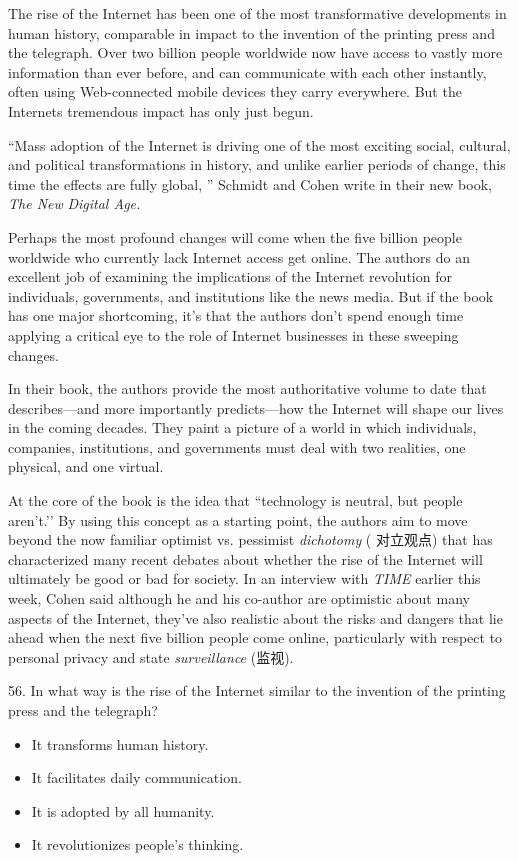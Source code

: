 \documentclass[UTF8,11pt]{ctexart}
\begin{document}
The rise of the Internet has been one of the most transformative developments in human history, comparable in impact to the invention of the printing press and the telegraph. Over two billion people worldwide now have access to vastly more information than ever before, and can communicate with each other instantly, often using Web-connected mobile devices they carry everywhere. But the Internets tremendous impact has only just begun.


“Mass adoption of the Internet is driving one of the most exciting social, cultural, and political transformations in history, and unlike earlier periods of change, this time the effects are fully global, ” Schmidt and Cohen write in their new book,\textit{ The New} \textit{Digital Age.}


Perhaps the most profound changes will come when the five billion people worldwide who currently lack Internet access get online. The authors do an excellent job of examining the implications of the Internet revolution for individuals, governments, and institutions like the news media. But if the book has one major shortcoming, it’s that the authors don’t spend enough time applying a critical eye to the role of Internet businesses in these sweeping changes.


In their book, the authors provide the most authoritative volume to date that describes—and more importantly predicts—how the Internet will shape our lives in the coming decades. They paint a picture of a world in which individuals, companies, institutions, and governments must deal with two realities, one physical, and one virtual.


At the core of the book is the idea that “technology is neutral, but people aren’t.’’ By using this concept as a starting point, the authors aim to move beyond the now familiar optimist vs. pessimist\textit{ dichotomy} ( 对立观点) that has characterized many recent debates about whether the rise of the Internet will ultimately be good or bad for society. In an interview with\textit{ TIME} earlier this week, Cohen said although he and his co-author are optimistic about many aspects of the Internet, they’ve also realistic about the risks and dangers that lie ahead when the next five billion people come online, particularly with respect to personal privacy and state\textit{ surveillance} (监视).


56. In what way is the rise of the Internet similar to the invention of the printing press and the telegraph?


\begin{itemize}[leftmargin=2em,itemsep=.2em,topsep=.4em]\item[A.] It transforms human history.
\item[B.] It facilitates daily communication.
\item[C.] It is adopted by all humanity.
\item[D.] It revolutionizes people’s thinking.
\end{itemize}
\end{document}

